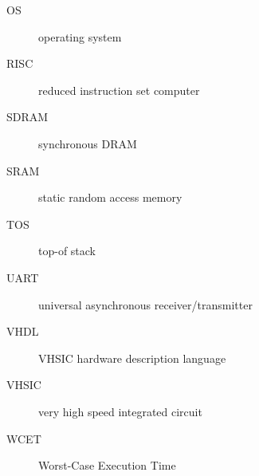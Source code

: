 \documentclass[%
    10pt,
    headinclude, footexclude,
    openright, %
    notitlepage,
    cleardoubleempty,
    headsepline,
    pointlessnumbers,
    bibtotoc, idxtotoc,
    ]{scrbook}
\begin{document}
\begin{description}
\item [OS] operating system
\item [RISC] reduced instruction set computer
\item [SDRAM] synchronous DRAM
\item [SRAM] static random access memory
\item [TOS] top-of stack
\item [UART] universal asynchronous receiver/transmitter
\item [VHDL] VHSIC hardware description language
\item [VHSIC] very high speed integrated circuit
\item [WCET] Worst-Case Execution Time
\end{description}






\printindex
\end{document}

